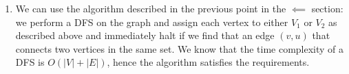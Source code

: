 \documentclass[10pt]{article}
\begin{document}
\begin{enumerate}
    \item We can use the algorithm described in the previous point in the $\impliedby$ section:
          we perform a DFS on the graph and assign each vertex to either $V_1$ or $V_2$ as described above and immediately halt if we find that an edge $(v, u)$ that connects two vertices in the same set.
          We know that the time complexity of a DFS is $O(|V| + |E|)$, hence the algorithm satisfies the requirements.
\end{enumerate}
\end{document}
